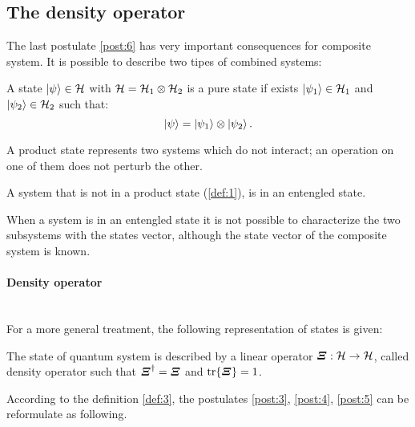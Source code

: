     \subsection{The density operator}
    \label{TheDensOp}
    The last postulate \ref{post:6} has very important consequences for composite system. It is possible
    to describe two tipes of combined systems:

    \begin{definition}
        A state $\ket{\psi}\in\mathcal{H}$ with $\mathcal{H}=\mathcal{H}_1\otimes\mathcal{H}_2$ is a
        pure state if exists $\ket{\psi_1}\in\mathcal{H}_1$ and $\ket{\psi_2}\in\mathcal{H}_2$
        such that:
        \begin{equation*}
            \ket{\psi}=\ket{\psi_1}\otimes\ket{\psi_2}.
        \end{equation*}
        \label{def:1}
    \end{definition}
    A product state represents two systems which do not interact; an operation on one of 
    them does not perturb the other.

    \begin{definition}
        A system that is not in a product state (\ref{def:1}), is in an entengled state. 
        \label{def:2}
    \end{definition}
    When a system is in an entengled state it is not possible to characterize the two subsystems
    with the states vector, although the state vector of the composite system is known.

    \paragraph{Density operator}\mbox{}\\
        For a more general treatment, the following representation of states is given:
        \begin{definition}
            The state of quantum system is described by a linear operator $\bm{\relax{\varXi}}:\mathcal{H}\to\mathcal{H}$, 
            called density operator such that 
            $\bm{\relax{\varXi}}^\dagger=\bm{\relax{\varXi}}$ and $\tr{\bm{\relax{\varXi}}}=1$.
            \label{def:3}
        \end{definition}
        According to the definition \ref{def:3}, the postulates \ref{post:3}, \ref{post:4},
        \ref{post:5} can be reformulate as following.
        
